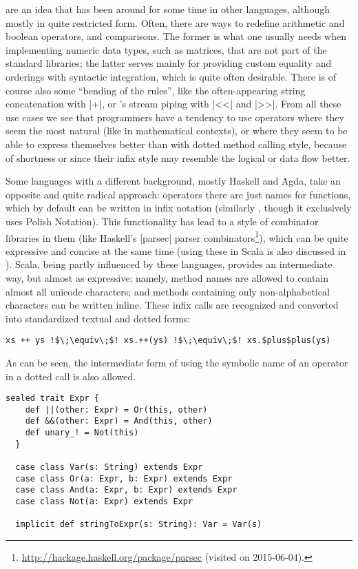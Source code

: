  are an idea that has been around for some time in other
languages, although mostly in quite restricted form. Often, there are ways to redefine arithmetic
and boolean operators, and comparisons. The former is what one usually needs when implementing
numeric data types, such as matrices, that are not part of the standard libraries; the latter serves
mainly for providing custom equality and orderings with syntactic integration, which is quite often
desirable. There is of course also some \enquote{bending of the rules}, like the often-appearing
string concatenation with |+|, or \CC{}'s stream piping with |<<| and |>>|. From all these use cases
we see that programmers have a tendency to use operators where they seem the most natural (like in
mathematical contexts), or where they seem to be able to express themselves better than with dotted
method calling style, because of shortness or since their infix style may resemble the logical or
data flow better.

Some languages with a different background, mostly Haskell and Agda, take an opposite and quite
radical approach: operators there are just names for functions, which by default can be written in
infix notation (similarly , though it exclusively uses Polish Notation). This
functionality has lead to a style of combinator libraries in them (like Haskell's |parsec| parser
combinators\footnote{\protect\url{http://hackage.haskell.org/package/parsec} (visited on
  2015-06-04).}), which can be quite expressive and concise at the same time (using these in Scala is
also discussed in {}). Scala, being partly influenced by these languages,
provides an intermediate way, but almost as expressive: namely, method names are allowed to contain
almost all unicode characters; and methods containing only non-alphabetical characters can be
written inline. These infix calls are recognized and converted into standardized textual and dotted
forms:
\begin{lstlisting}[escapechar=!]
  xs ++ ys !$\;\equiv\;$! xs.++(ys) !$\;\equiv\;$! xs.$plus$plus(ys)
\end{lstlisting}
As can be seen, the intermediate form of using the symbolic name of an operator in a dotted call is
also allowed.

\begin{lstlisting}[style=floating,
  caption={A small \dsl{} to represent symbolic propositional formulae. The implicit conversion in
    Line~12 allows to leave out the \lstinline|Var| constructor; such conversions are explainened in
    \autosubref{sec:implicits}.
    \hfill\github{dsl-examples/blob/master/src/main/scala/dsl_examples/Logic.scala}},
  label=lst:logic]
  sealed trait Expr {
    def ||(other: Expr) = Or(this, other)
    def &&(other: Expr) = And(this, other)
    def unary_! = Not(this)
  }

  case class Var(s: String) extends Expr
  case class Or(a: Expr, b: Expr) extends Expr
  case class And(a: Expr, b: Expr) extends Expr
  case class Not(a: Expr) extends Expr
  
  implicit def stringToExpr(s: String): Var = Var(s)
\end{lstlisting}

